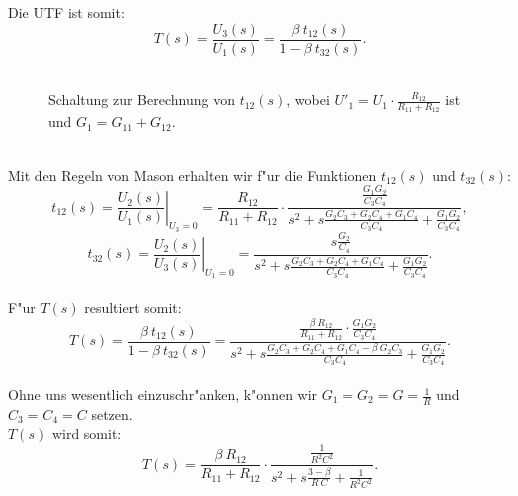 \nit Die UTF ist somit:
\begin{equation*}
T(s)=\frac{U_3(s)}{U_1(s)}=\frac{\beta ~t_{12}(s)}{1-\beta ~t_{32}(s)}.
\end{equation*}\\
\begin{figure}[!htb]
\vspace*{-3mm}
\begin{center}
  \caption{Schaltung zur Berechnung von $t_{12}(s)$, wobei $U'_1=U_{1}\cdot \frac{R_{12}}{R_{11} + R_{12}}$ ist und $G_1=G_{11}+G_{12}$.}
\end{center}
\vspace*{-6mm}
\end{figure}\\
\nit Mit den Regeln von Mason erhalten wir f"ur die Funktionen $t_{12}(s)$ und $t_{32}(s)$:
\begin{equation*}
t_{12}(s)=\left. \frac{U_2(s)}{U_1(s)} \right|_{U_3=0}=\frac{R_{12}}{R_{11} + R_{12}} \cdot
  \frac{
  \displaystyle\frac{G_1 G_2}{C_3 C_4}}
       {s^2 + s \displaystyle\frac{G_2 C_3 + G_2 C_4 + G_1 C_4}{C_3 C_4}
            + \displaystyle\frac{G_1 G_2}{C_3 C_4}},
\end{equation*}
\begin{equation*}
t_{32}(s)=\left. \frac{U_2(s)}{U_3(s)} \right|_{U_1=0}=\frac{s \displaystyle\frac{G_2}{C_4}}
              {s^2 + s \displaystyle\frac{G_2 C_3 + G_2 C_4 + G_1 C_4}{C_3 C_4}
                      + \displaystyle\frac{G_1 G_2}{C_3 C_4}}.
\end{equation*}\\
\nit F"ur $T(s)$ resultiert somit:
\begin{equation*}
T(s)=\frac{\beta ~t_{12}(s)}{1-\beta ~t_{32}(s)}=
  \frac{\displaystyle\frac{\beta ~R_{12}}{R_{11} + R_{12}} \cdot\displaystyle\frac{G_1 G_2}{C_3 C_4}}
{s^2 + s \displaystyle\frac{G_2 C_3+G_2 C_4+G_1 C_4-\beta ~G_2 C_3}{C_3 C_4}
            + \displaystyle\frac{G_1 G_2}{C_3 C_4}}.
\end{equation*}\\
\nit Ohne uns wesentlich einzuschr"anken, k"onnen wir $G_1=G_2=G=\frac{1}{R}$ und $C_3=C_4=C$ setzen.\\ 
\nit $T(s)$ wird somit:
\begin{equation*}
T(s)=\frac{\beta ~R_{12}}{R_{11} + R_{12}} \cdot
  \frac{\displaystyle\frac{1}{R^2 C^2}}
       {s^2 + s \displaystyle\frac{3-\beta }{R~C}
            + \displaystyle\frac{1}{R^2 C^2}}.
\end{equation*}\\
